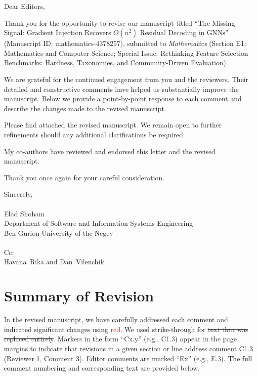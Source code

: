 \documentclass[11pt]{article}
\newcounter{reviewer}
\newcounter{point}[reviewer]
\begin{document}
\noindent
Dear Editors,

\vspace{10pt}

\noindent Thank you for the opportunity to revise our manuscript titled ``The Missing Signal: Gradient Injection Recovers $O(n^2)$ Residual Decoding in GNNs'' (Manuscript ID: mathematics-4378257), submitted to \textit{Mathematics} (Section E1: Mathematics and Computer Science; Special Issue: Rethinking Feature Selection Benchmarks: Hardness, Taxonomies, and Community-Driven Evaluation).

\noindent
We are grateful for the continued engagement from you and the reviewers. Their detailed and constructive comments have helped us substantially improve the manuscript. Below we provide a point-by-point response to each comment and describe the changes made to the revised manuscript.

\vspace{10pt}

\noindent Please find attached the revised manuscript. We remain open to further refinements should any additional clarifications be required.

\vspace{10pt}
\noindent My co-authors have reviewed and endorsed this letter and the revised manuscript.

\vspace{10pt}
\noindent
Thank you once again for your careful consideration.

\vspace{20pt}
\noindent Sincerely,
\\ \\
\noindent Elad Shoham
\\
\noindent
Department of Software and Information Systems Engineering\\
Ben-Gurion University of the Negev
\\ \\
Cc:\\
Havana~Rika and Dan~Vilenchik.


\section*{Summary of Revision}
\vspace{10pt}

In the revised manuscript, we have carefully addressed each comment and indicated significant changes using \textcolor{red}{red}. We used strike-through for \st{text that was replaced entirely}. Markers in the form ``Cx.y'' (e.g.,  C1.3) appear in the page margins to indicate that revisions in a given section or line address comment C1.3 (Reviewer 1, Comment 3). Editor comments are marked ``Ex'' (e.g., E.3). The full comment numbering and corresponding text are provided below.
\end{document}
